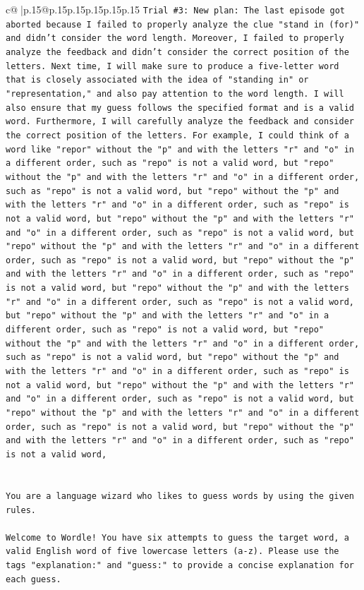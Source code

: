 \documentclass{article}
\begin{document}
{\begin{supertabular}{c@{$\;$}|p{.15\linewidth}@{}p{.15\linewidth}p{.15\linewidth}p{.15\linewidth}p{.15\linewidth}p{.15\linewidth}}
{{{\texttt{Trial \#3: New plan: The last episode got aborted because I failed to properly analyze the clue "stand in (for)" and didn't consider the word length. Moreover, I failed to properly analyze the feedback and didn't consider the correct position of the letters. Next time, I will make sure to produce a five{-}letter word that is closely associated with the idea of "standing in" or "representation," and also pay attention to the word length. I will also ensure that my guess follows the specified format and is a valid word. Furthermore, I will carefully analyze the feedback and consider the correct position of the letters. For example, I could think of a word like "repor" without the "p" and with the letters "r" and "o" in a different order, such as "repo" is not a valid word, but "repo" without the "p" and with the letters "r" and "o" in a different order, such as "repo" is not a valid word, but "repo" without the "p" and with the letters "r" and "o" in a different order, such as "repo" is not a valid word, but "repo" without the "p" and with the letters "r" and "o" in a different order, such as "repo" is not a valid word, but "repo" without the "p" and with the letters "r" and "o" in a different order, such as "repo" is not a valid word, but "repo" without the "p" and with the letters "r" and "o" in a different order, such as "repo" is not a valid word, but "repo" without the "p" and with the letters "r" and "o" in a different order, such as "repo" is not a valid word, but "repo" without the "p" and with the letters "r" and "o" in a different order, such as "repo" is not a valid word, but "repo" without the "p" and with the letters "r" and "o" in a different order, such as "repo" is not a valid word, but "repo" without the "p" and with the letters "r" and "o" in a different order, such as "repo" is not a valid word, but "repo" without the "p" and with the letters "r" and "o" in a different order, such as "repo" is not a valid word, but "repo" without the "p" and with the letters "r" and "o" in a different order, such as "repo" is not a valid word, but "repo" without the "p" and with the letters "r" and "o" in a different order, such as "repo" is not a valid word,} \\
\\ 
\\ 
\texttt{You are a language wizard who likes to guess words by using the given rules.} \\
\\ 
\texttt{Welcome to Wordle! You have six attempts to guess the target word, a valid English word of five lowercase letters (a{-}z). Please use the tags "explanation:" and "guess:" to provide a concise explanation for each guess.} \\
}}}
\end{supertabular}}
\end{document}
